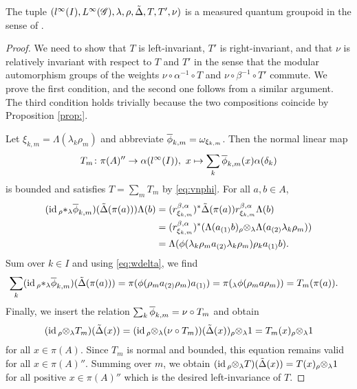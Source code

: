 \begin{Theorem}
The tuple    $(l^{\infty}(I),L^{\infty}(\mathscr{G}),\lambda,\rho,\tilde\Delta,T,T',\nu)$
  is a measured quantum groupoid in the sense of \cite{enock:action}.
\end{Theorem}
\begin{proof}
  We need to show that $T$ is left-invariant, $T'$ is right-invariant,
  and that $\nu$ is relatively invariant with respect to $T$ and $T'$
  in the sense that the modular automorphism groups of the weights
  $\nu \circ \alpha^{-1} \circ T$ and $\nu \circ \beta^{-1} \circ T'$
  commute.  We prove the first condition, and the second one follows from
  a similar argument. The third condition holds trivially because the
  two compositions coincide by Proposition \ref{prop:}. 

  Let $\xi_{k,m}=\Lambda(\lambda_{k}\rho_{m})$ and abbreviate
  $\overline{\phi}_{k,m}=\omega_{\xi_{k,m}}$. Then the normal linear map
  \begin{align*}
    T_{m}\colon \pi(A)'' \to \alpha(l^{\infty}(I)), \ x\mapsto \sum_{k} \overline{\phi}_{k,m}(x)\alpha(\delta_{k})
  \end{align*}
  is bounded and satisfies $T=\sum_{m} T_{m}$ by
  \eqref{eq:vnphi}. For all $a,b\in
  A$,
  \begin{align*}
    (\operatorname{id} {_{\rho}\ast_{\lambda}} \overline{\phi}_{k,m})(\tilde\Delta(\pi(a)))\Lambda(b) &=
    (r^{\beta,\alpha}_{\xi_{k,m}})^{*}\tilde\Delta(\pi(a))r^{\beta,\alpha}_{\xi_{k,m}}
    \Lambda(b) \\
    &= (r^{\beta,\alpha}_{\xi_{k,m}})^{*}(\Lambda(a_{(1)}b)
    {_{\rho} \otimes_{\lambda}} \Lambda(a_{(2)}\lambda_{k}\rho_{m})) \\
    &=
    \Lambda(\phi(\lambda_{k}\rho_{m}a_{(2)}\lambda_{k}\rho_{m})\rho_{k}a_{(1)}b).
  \end{align*}
  Sum over $k \in I$ and using \eqref{eq:wdelta}, we find
  \begin{align*}
 \sum_{k} (\operatorname{id}
 {_{\rho}\ast_{\lambda}} \overline{\phi}_{k,m})(\tilde\Delta(\pi(a))) &=
\pi(\phi(\rho_{m}a_{(2)}\rho_{m})a_{(1)})  =
\pi(_{\lambda}\phi(\rho_{m}a\rho_{m})) = T_{m}(\pi(a)).
  \end{align*}
  Finally, we insert the relation $\sum_{k} \overline{\phi}_{k,m} = \nu \circ
  T_{m}$ and obtain
\begin{align*}
  (\operatorname{id} {_{\rho}\otimes_{\lambda}} T_{m})(\tilde\Delta(x)) = (\operatorname{id} {_{\rho}\otimes_{\lambda}}
  (\nu \circ T_{m}))(\tilde\Delta(x)) {_{\rho}\otimes_{\lambda}} 1 = T_{m}(x)  {_{\rho}\otimes_{\lambda}} 1
\end{align*}
for all $x\in \pi(A)$.  Since $T_{m}$ is normal and bounded, this
equation remains valid for all $x\in \pi(A)''$. Summing over $m$, we
obtain $(\operatorname{id} {_{\rho}\otimes_{\lambda}} T)(\tilde\Delta(x)) = T(x)  {_{\rho}\otimes_{\lambda}} 1$ for all
positive $x \in \pi(A)''$ which is the desired left-invariance of $T$.
\end{proof}


